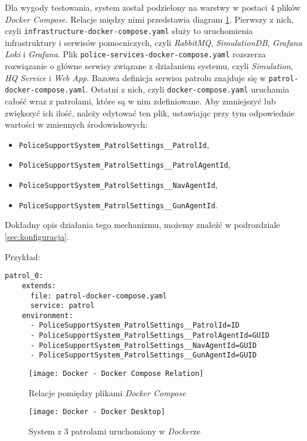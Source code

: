 \par Dla wygody testowania, system został podzielony na warstwy w postaci 4 plików \emph{Docker Compose}. Relacje między nimi przedstawia diagram \ref{fig:dockerDockerComposeRelation}. Pierwszy z nich, czyli \texttt{infrastructure-docker-compose.yaml} służy to uruchomienia infrastruktury i serwisów pomocniczych, czyli \emph{RabbitMQ}, \emph{SimulationDB}, \emph{Grafana Loki} i \emph{Grafana}. Plik \texttt{police-services-docker-compose.yaml} rozszerza rozwiązanie o główne serwisy związane z działaniem systemu, czyli \emph{Simulation}, \emph{HQ Service} i \emph{Web App}. Bazowa definicja serwisu patrolu znajduje się w \texttt{patrol-docker-compose.yaml}. Ostatni z nich, czyli \texttt{docker-compose.yaml} uruchamia całość wraz z patrolami, które są w nim zdefiniowane. Aby zmniejszyć lub zwiększyć ich ilość, należy edytować ten plik, ustawiając przy tym odpowiednie wartości w zmiennych środowiskowych:
\begin{itemize}
    \item \texttt{PoliceSupportSystem\_PatrolSettings\_\_PatrolId},
    \item \texttt{PoliceSupportSystem\_PatrolSettings\_\_PatrolAgentId},
    \item \texttt{PoliceSupportSystem\_PatrolSettings\_\_NavAgentId},
    \item \texttt{PoliceSupportSystem\_PatrolSettings\_\_GunAgentId}.
\end{itemize}
Dokładny opis działania tego mechanizmu, możemy znaleźć w podrozdziale \ref{sec:konfiguracja}.

Przykład:
\begin{Verbatim}[samepage=true]
patrol_0:
    extends:
      file: patrol-docker-compose.yaml
      service: patrol
    environment:
      - PoliceSupportSystem_PatrolSettings__PatrolId=ID
      - PoliceSupportSystem_PatrolSettings__PatrolAgentId=GUID
      - PoliceSupportSystem_PatrolSettings__NavAgentId=GUID
      - PoliceSupportSystem_PatrolSettings__GunAgentId=GUID
\end{Verbatim}

\begin{figure}
    \centering
    \texttt{[image: Docker - Docker Compose Relation]}
    \caption{Relacje pomiędzy plikami \emph{Docker Compose}}
    \label{fig:dockerDockerComposeRelation}
\end{figure}

\begin{figure}
    \centering
    \texttt{[image: Docker - Docker Desktop]}
    \caption{System z 3 patrolami uruchomiony w \emph{Docker}ze}
    \label{fig:dockerDockerDesktop}
\end{figure}